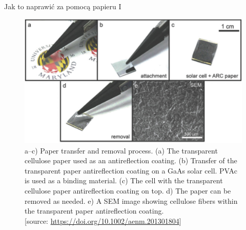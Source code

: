 \documentclass{beamer}
\begin{document}
\begin{frame}{Jak to naprawić za pomocą papieru I}
    \begin{figure}[h]
        \centering
        \includegraphics[width=0.75\linewidth]{fig2.png}
        \caption{a–c) Paper transfer and removal process. (a) The transparent cellulose paper used as an antireflection coating. (b) Transfer of the transparent paper antireflection coating on a GaAs solar cell. PVAc is used as a binding material. (c) The cell with the transparent cellulose paper antireflection coating on top. d) The paper can be removed as needed. e) A SEM image showing cellulose fibers within the transparent paper antireflection coating.\\
        [source: \url{https://doi.org/10.1002/aenm.201301804}]
        }
        
    \end{figure}

\end{frame}
\end{document}
